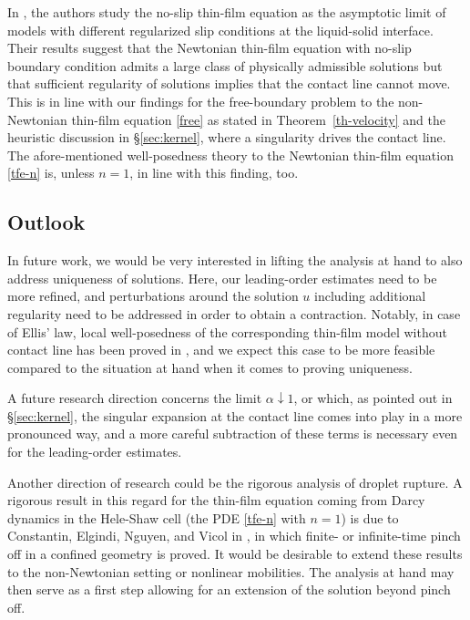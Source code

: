 \documentclass[reqno,12pt]{amsart}
\numberwithin{equation}{section}
\begin{document}
%
\bigskip
%

In \cite{Knuepfer_Velazquez2025}, the authors study the no-slip thin-film equation as the asymptotic limit of models with different regularized slip conditions at the liquid-solid interface. Their results suggest that the Newtonian thin-film equation with no-slip boundary condition admits a large class of physically admissible solutions but that sufficient regularity of solutions implies that the contact line cannot move. This is in line with our findings for the free-boundary problem to the non-Newtonian thin-film equation \eqref{free} as stated in Theorem~\ref{th-velocity} and the heuristic discussion in \S\ref{sec:kernel}, where a singularity drives the contact line. The afore-mentioned well-posedness theory to the Newtonian thin-film equation \eqref{tfe-n} is, unless $n = 1$, in line with this finding, too.

%
\subsection{Outlook}
%
In future work, we would be very interested in lifting the analysis at hand to also address uniqueness of solutions. Here, our leading-order estimates need to be more refined, and perturbations around the solution $u$ including additional regularity need to be addressed in order to obtain a contraction. Notably, in case of Ellis' law, local well-posedness of the corresponding thin-film model without contact line has been proved in \cite{LienstrombergMueller2020}, and we expect this case to be more feasible compared to the situation at hand when it comes to proving uniqueness.

%
\bigskip
%

A future research direction concerns the limit $\alpha \downarrow 1$, or which, as pointed out in \S\ref{sec:kernel}, the singular expansion at the contact line comes into play in a more pronounced way, and a more careful subtraction of these terms is necessary even for the leading-order estimates.

%
\bigskip
%

Another direction of research could be the rigorous analysis of droplet rupture. A rigorous result in this regard for the thin-film equation coming from Darcy dynamics in the Hele-Shaw cell (the PDE \eqref{tfe-n} with $n = 1$) is due to Constantin, Elgindi, Nguyen, and Vicol in \cite{ConstantinElgindiNguyenVicol2018}, in which finite- or infinite-time pinch off in a confined geometry is proved. It would be desirable to extend these results to the non-Newtonian setting or nonlinear mobilities. The analysis at hand may then serve as a first step allowing for an extension of the solution beyond pinch off.
\end{document}
